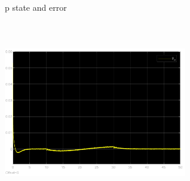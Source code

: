 \documentclass[12pt, a4paper]{article}
\begin{document}
\begin{enumerate}[1.]
\begin{figure}[H]
        \centering
        \qquad
        \caption{p state and error}
        \label{fig:example}%
    \end{figure}
\begin{figure}[H]
    \centering
    \includegraphics[width=8cm,height=8cm,scale=0.6]{p_o.png}

\end{figure}
\end{enumerate}
\end{document}
